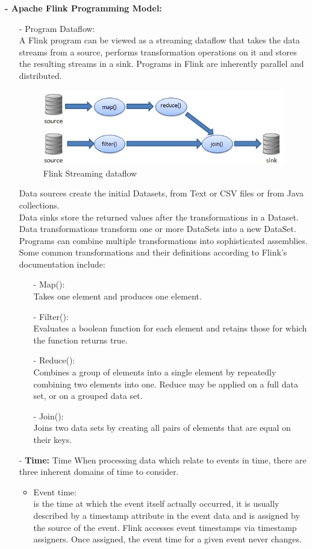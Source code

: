 \textbf{- Apache Flink Programming Model:}
\begin{itemize}
\item[-] Program Dataflow:\\
 
 A Flink program can be viewed as a streaming dataflow that takes the data streams from a source, performs transformation operations on it and stores the resulting streams in a sink.
Programs in Flink are inherently parallel and distributed.
 				\begin{figure}[h!]
					\centering
					\includegraphics[scale=0.7]{graphics/concepts.PNG} 
					\caption{Flink Streaming dataflow} \label{dataflow} 
				\end{figure}
Data sources create the initial Datasets, from Text or CSV files or from Java collections. \\
					Data sinks store the returned values after the transformations in a Dataset.\\
					Data transformations transform one or more DataSets into a new DataSet. Programs can combine multiple transformations into sophisticated assemblies. Some common transformations and their definitions according to Flink's documentation \cite{transf} include:
\begin{itemize}
\item[-] Map(): \\	
Takes one element and produces one element.
\item[-] Filter(): \\	
Evaluates a boolean function for each element and retains those for which the function returns true.
\item[-] Reduce(): \\	
Combines a group of elements into a single element by repeatedly combining two elements into one. Reduce may be applied on a full data set, or on a grouped data set.
\item[-] Join(): \\	
	Joins two data sets by creating all pairs of elements that are equal on their keys.
	 \end{itemize}
 \item[-]\textbf{ Time:}
Time
When processing data which relate to events in time, there are three inherent domains of time to consider. 
	\begin{itemize}
\item   Event time:\\
 is the time at which the event itself actually occurred, it is usually described by a timestamp attribute in the event data and is assigned by the source of the event. Flink accesses event timestamps via timestamp assigners.
 Once assigned, the event time for a given event never changes.
 

\end{itemize}
\end{itemize}
